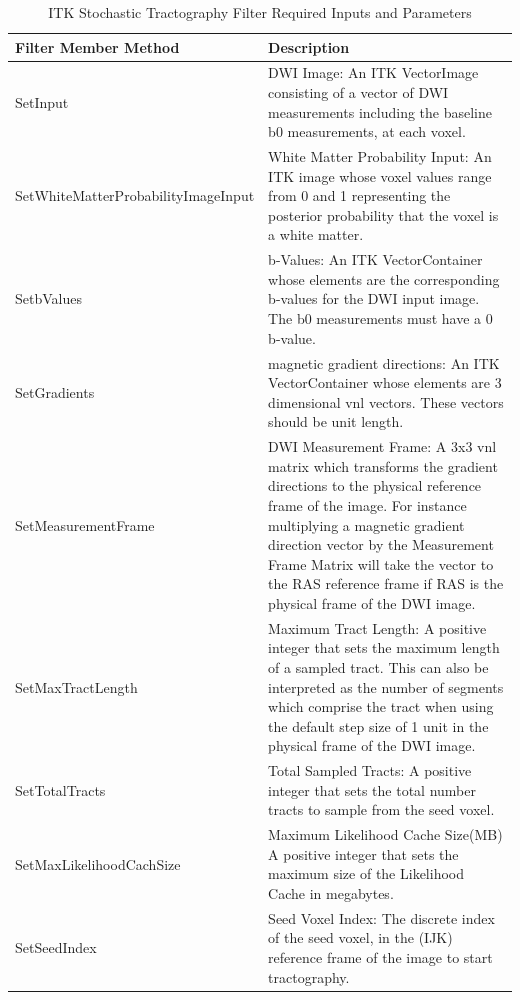 \begin{table}
  \center
  \begin{tabular}{| l | p{8cm} |}
    \hline 
    \textbf{Filter Member Method} & \textbf{Description}\\
    \hline
    \small{SetInput} & DWI Image: An ITK VectorImage consisting of a vector of DWI measurements including the baseline b0 measurements, at each voxel. \\
    \hline
    \small{SetWhiteMatterProbabilityImageInput} & White Matter Probability Input: An ITK image whose voxel values range from 0 and 1 representing the posterior probability that the voxel is a white matter.  \\
    \hline
    \small{SetbValues} &  b-Values: An ITK VectorContainer whose elements are the corresponding b-values for the DWI input image.  The b0 measurements must have a 0 b-value. \\
    \hline
    \small{SetGradients} & magnetic gradient directions: An ITK VectorContainer whose elements are 3 dimensional vnl vectors.  These vectors should be unit length.\\
    \hline
    \small{SetMeasurementFrame} & DWI Measurement Frame: A 3x3 vnl matrix which transforms the gradient directions to the physical reference frame of the image.  For instance multiplying a magnetic gradient direction vector by the Measurement Frame Matrix will take the vector to the RAS reference frame if RAS is the physical frame of the DWI image. \\
    \hline
    \small{SetMaxTractLength} & Maximum Tract Length: A positive integer that sets the maximum length of a sampled tract.  This can also be interpreted as the number of segments which comprise the tract when using the default step size of 1 unit in the physical frame of the DWI image. \\
    \hline
    \small{SetTotalTracts} & Total Sampled Tracts: A positive integer that sets the total number tracts to sample from the seed voxel. \\
    \hline
    \small{SetMaxLikelihoodCachSize} & Maximum Likelihood Cache Size(MB) A positive integer that sets the maximum size of the Likelihood Cache in megabytes.\\
    \hline
    \small{SetSeedIndex} & Seed Voxel Index:  The discrete index of the seed voxel, in the (IJK) reference frame of the image to start tractography.\\
    \hline
  \end{tabular}
  \caption{ITK Stochastic Tractography Filter Required Inputs and Parameters}
  \label{tab:filterinputs}
\end{table}

